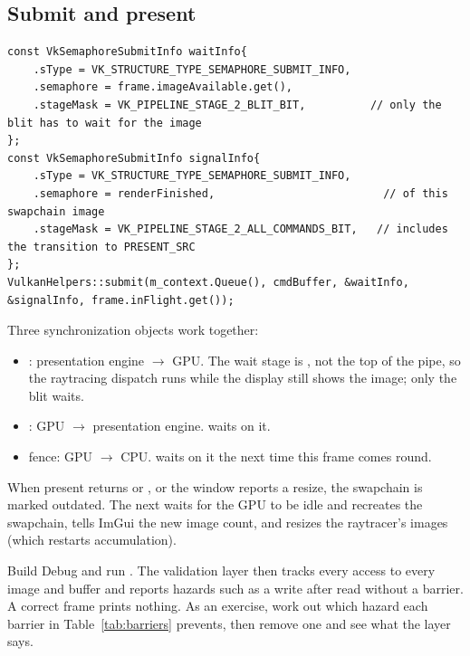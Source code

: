 \documentclass[11pt,a4paper]{article}
\begin{document}
\subsection{Submit and present}

\begin{lstlisting}
const VkSemaphoreSubmitInfo waitInfo{
    .sType = VK_STRUCTURE_TYPE_SEMAPHORE_SUBMIT_INFO,
    .semaphore = frame.imageAvailable.get(),
    .stageMask = VK_PIPELINE_STAGE_2_BLIT_BIT,          // only the blit has to wait for the image
};
const VkSemaphoreSubmitInfo signalInfo{
    .sType = VK_STRUCTURE_TYPE_SEMAPHORE_SUBMIT_INFO,
    .semaphore = renderFinished,                          // of this swapchain image
    .stageMask = VK_PIPELINE_STAGE_2_ALL_COMMANDS_BIT,   // includes the transition to PRESENT_SRC
};
VulkanHelpers::submit(m_context.Queue(), cmdBuffer, &waitInfo, &signalInfo, frame.inFlight.get());
\end{lstlisting}

Three synchronization objects work together:

\begin{itemize}
  \item {}: presentation engine $\rightarrow$ GPU. The wait stage is , not the top of the pipe, so the raytracing dispatch runs while the display still shows the image; only the blit waits.
  \item {}: GPU $\rightarrow$ presentation engine.  waits on it.
  \item {} fence: GPU $\rightarrow$ CPU.  waits on it the next time this frame comes round.
\end{itemize}

When present returns  or , or the window reports a resize, the swapchain is marked outdated. The next  waits for the GPU to be idle and recreates the swapchain, tells ImGui the new image count, and resizes the raytracer's images (which restarts accumulation).

\begin{tryit}
Build Debug and run . The validation layer then tracks every access to every image and buffer and reports hazards such as a write after read without a barrier. A correct frame prints nothing. As an exercise, work out which hazard each barrier in Table~\ref{tab:barriers} prevents, then remove one and see what the layer says.
\end{tryit}
\end{document}

